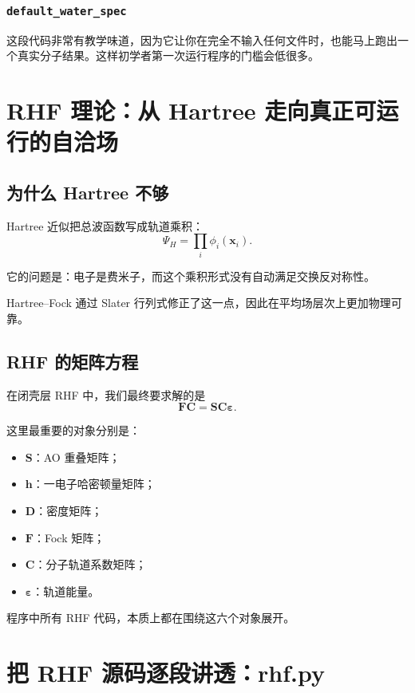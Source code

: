 \documentclass[UTF8,11pt,fontset=fandol]{ctexbook}
\begin{document}
\subsection*{\texttt{default\_water\_spec}}

这段代码非常有教学味道，因为它让你在完全不输入任何文件时，也能马上跑出一个真实分子结果。这样初学者第一次运行程序的门槛会低很多。

\chapter{RHF 理论：从 Hartree 走向真正可运行的自洽场}

\section{为什么 Hartree 不够}

Hartree 近似把总波函数写成轨道乘积：
\begin{equation}
\Psi_H = \prod_i \phi_i(\mathbf{x}_i).
\end{equation}

它的问题是：电子是费米子，而这个乘积形式没有自动满足交换反对称性。

Hartree--Fock 通过 Slater 行列式修正了这一点，因此在平均场层次上更加物理可靠。

\section{RHF 的矩阵方程}

在闭壳层 RHF 中，我们最终要求解的是
\begin{equation}
\mathbf{F}\mathbf{C} = \mathbf{S}\mathbf{C}\bm{\varepsilon}.
\end{equation}

这里最重要的对象分别是：
\begin{itemize}
  \item $\mathbf{S}$：AO 重叠矩阵；
  \item $\mathbf{h}$：一电子哈密顿量矩阵；
  \item $\mathbf{D}$：密度矩阵；
  \item $\mathbf{F}$：Fock 矩阵；
  \item $\mathbf{C}$：分子轨道系数矩阵；
  \item $\bm{\varepsilon}$：轨道能量。
\end{itemize}

程序中所有 RHF 代码，本质上都在围绕这六个对象展开。

\chapter{把 RHF 源码逐段讲透：rhf.py}
\end{document}
